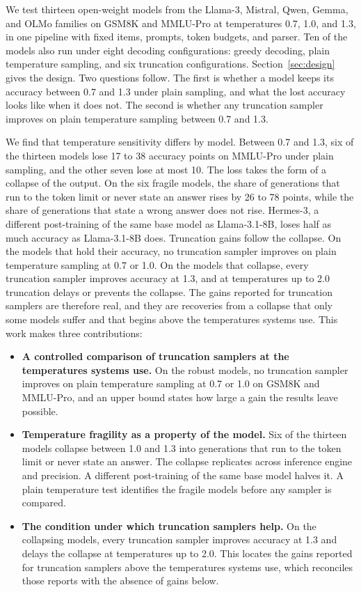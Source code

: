 \documentclass[10pt]{article}
\begin{document}
We test thirteen open-weight models from the Llama-3, Mistral, Qwen, Gemma, and OLMo families
on GSM8K and MMLU-Pro at temperatures 0.7, 1.0, and 1.3, in one pipeline with fixed items,
prompts, token budgets, and parser. Ten of the models also run under eight decoding
configurations: greedy decoding, plain temperature sampling, and six truncation configurations.
Section~\ref{sec:design} gives the design. Two questions follow. The first is whether a model
keeps its accuracy between 0.7 and 1.3 under plain sampling, and what the lost accuracy looks
like when it does not. The second is whether any truncation sampler improves on plain temperature
sampling between 0.7 and 1.3.

We find that temperature sensitivity differs by model. Between 0.7 and 1.3, six of the thirteen
models lose 17 to 38 accuracy points on MMLU-Pro under plain sampling, and the other seven lose
at most 10. The loss takes the form of a collapse of the output. On the six fragile models, the
share of generations that run to the token limit or never state an answer rises by 26 to 78
points, while the share of generations that state a wrong answer does not rise. Hermes-3, a
different post-training of the same base model as Llama-3.1-8B, loses half as much accuracy as
Llama-3.1-8B does. Truncation gains follow the
collapse. On the models that hold their accuracy, no truncation sampler improves on plain
temperature sampling at 0.7 or 1.0. On the models that collapse, every truncation sampler
improves accuracy at 1.3, and at temperatures up to 2.0 truncation delays or prevents the
collapse. The gains reported for truncation samplers are therefore real, and they are recoveries
from a collapse that only some models suffer and that begins above the temperatures systems
use. This work makes three contributions:

\begin{itemize}
\item \textbf{A controlled comparison of truncation samplers at the temperatures systems use.}
On the robust models, no truncation sampler improves on plain temperature sampling at 0.7 or
1.0 on GSM8K and MMLU-Pro, and an upper bound states how large a gain the results leave
possible.
\item \textbf{Temperature fragility as a property of the model.} Six of the thirteen models
collapse between 1.0 and 1.3 into generations that run to the token limit or never state an
answer. The collapse replicates across inference engine and precision. A different
post-training of the same base model halves it. A plain temperature test identifies the
fragile models before any sampler is compared.
\item \textbf{The condition under which truncation samplers help.} On the collapsing models,
every truncation sampler improves accuracy at 1.3 and delays the collapse at temperatures up
to 2.0. This locates the gains reported for truncation samplers above the temperatures systems
use, which reconciles those reports with the absence of gains below.
\end{itemize}
\end{document}
